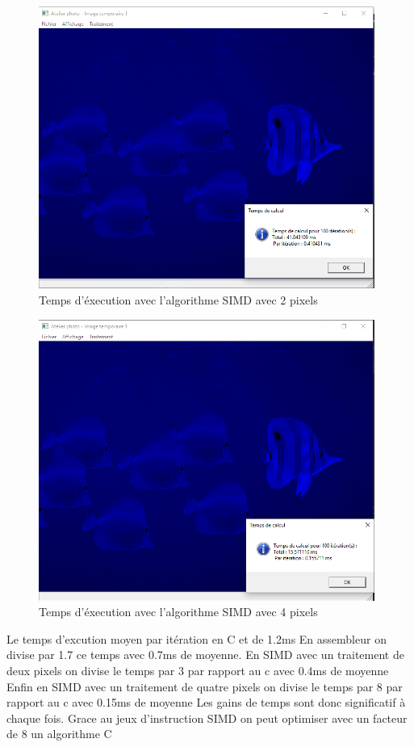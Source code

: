 \documentclass[11pt]{report}
\begin{document}
\begin{figure}[h]
\includegraphics[width=11cm]{CaptureSimd2.PNG}
\caption{Temps d'éxecution avec l'algorithme SIMD avec 2 pixels}
\end{figure}

\begin{figure}[h]
\includegraphics[width=11cm]{CaptureSimd4.PNG}
\caption{Temps d'éxecution avec l'algorithme SIMD avec 4 pixels}
\end{figure}

Le temps d'excution moyen par itération en C et de 1.2ms
En assembleur on divise par 1.7 ce temps avec 0.7ms de moyenne.
En SIMD avec un traitement de deux pixels on divise le temps par 3 par rapport au c avec 0.4ms de moyenne
Enfin en SIMD avec un traitement de quatre pixels on divise le temps par 8 par rapport au c avec 0.15ms de moyenne
Les gains de temps sont donc significatif à chaque fois. Grace au jeux d'instruction SIMD on peut optimiser avec un facteur de 8 un algorithme C
\end{document}
